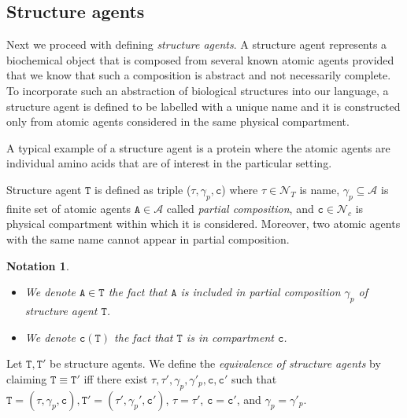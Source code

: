 \documentclass{entcs}
\renewcommand{\~}[0]{\texttildelow}
\newtheorem{notation}[thm]{Notation}
\begin{document}
\subsection{Structure agents}

Next we proceed with defining \emph{structure agents}. A structure agent represents a biochemical object that is composed from several known atomic agents provided that we know that such a composition is abstract and not necessarily complete. To incorporate such an abstraction of biological structures into our language, a structure agent is defined to be labelled with a unique name and it is constructed only from atomic agents considered in the same physical compartment. 

A typical example of a structure agent is a protein where the atomic agents are individual amino acids that are of interest in the particular setting.

\begin{defn}
Structure agent $\mathtt{T}$ is defined as triple ($\tau, \gamma_p, \mathtt{c}$) where $\tau \in \mathcal{N}_{T}$ is name, $\gamma_p \subseteq \mathcal{A}$ is finite set of atomic agents $\mathtt{A} \in \mathcal{A}$ called \emph{partial composition}, and $\mathtt{c} \in \mathcal{N}_{c}$ is physical compartment within which it is considered. Moreover, two atomic agents with the same name cannot appear in partial composition.
\end{defn}

\begin{notation}
{~}
\begin{itemize}
\item We denote $\mathtt{A} \in \mathtt{T}$ the fact that $\mathtt{A}$ is included in partial composition $\gamma_p$ of structure agent $\mathtt{T}$.
\item We denote $\mathtt{c}(\mathtt{T})$ the fact that $\mathtt{T}$ is in compartment $\mathtt{c}$.
\end{itemize}
\end{notation}

\begin{defn}
Let $\mathtt{T},\mathtt{T}'$ be structure agents. We define the \emph{equivalence of structure agents} by claiming $\mathtt{T}\equiv\mathtt{T}'$ iff there exist $\tau,\tau',\gamma_p,\gamma'_p,\mathtt{c},\mathtt{c}'$ such that $\mathtt{T}=(\tau, \gamma_p, \mathtt{c}),\mathtt{T}'=(\tau', \gamma_p', \mathtt{c}')$, $\tau=\tau'$, $\mathtt{c} = \mathtt{c}'$, and $\gamma_p=\gamma'_p$.
\end{defn}
\end{document}
